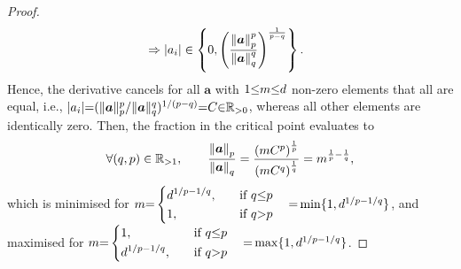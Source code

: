 \begin{proof}
\begin{gather*}
\begin{aligned}
&\Rightarrow \left\lvert a_i\right\rvert \in \left\lbrace 0 , \left( \frac{\left\lVert\boldsymbol{a}\right\rVert_p^p}{\left\lVert\boldsymbol{a}\right\rVert_q^q} \right)^{\frac{1}{p-q}} \right\rbrace.
\end{aligned}
\end{gather*}
Hence, the derivative cancels for all $\boldsymbol{a}$ with $1 {\leq} m {\leq} d$ non-zero elements that all are equal, i.e., $|a_i| {=} (\Vert \boldsymbol{a} \Vert_p^p / \Vert \boldsymbol{a} \Vert_q^q) ^ {1/(p-q)} {=} C {\in} \mathbb{R}_{>0}$, whereas all other elements are identically zero. 
Then, the fraction in the critical point evaluates to
\begin{gather*}
\forall (q,p) \in \mathbb{R}_{> 1}, \qquad
\frac{\left\lVert\boldsymbol{a}\right\rVert_p}{\left\lVert\boldsymbol{a}\right\rVert_q} = 
\frac{\left( m C^p \right)^{\frac1p}}{\left( m C^q \right)^{\frac1q}} = 
m ^{\frac1p - \frac1q},
\end{gather*}
which is minimised for $m {=}
  \begin{cases}
  \begin{aligned}
    &d^{1/p-1/q},   \quad  && \text{if } q {\leq} p\\
    &1,   \quad && \text{if } q {>} p\\
  \end{aligned}
  \end{cases} {=} \min\{1 , d^{1/p-1/q}\}$, and maximised for $m {=}
  \begin{cases}
  \begin{aligned}
    &1,  \quad  && \text{if } q {\leq} p\\
    &d^{1/p-1/q},  \quad && \text{if } q {>} p\\
     \end{aligned}
     \end{cases} {=} \max\{1 , d^{1/p-1/q}\}$.
     

\end{proof}
